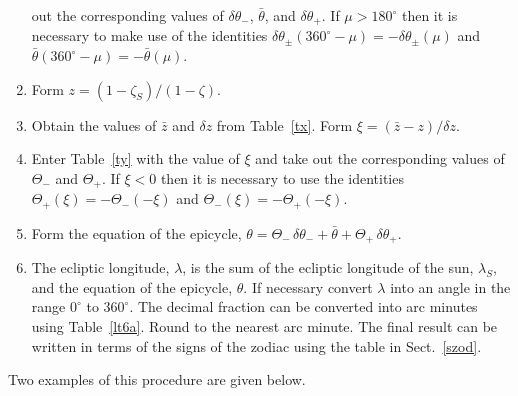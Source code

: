 \begin{enumerate}
out the corresponding values of $\delta\theta_-$, $\bar{\theta}$, and
$\delta\theta_+$. If $\mu > 180^\circ$ then it is necessary to make use
of the identities $\delta\theta_\pm(360^\circ - \mu) =-\delta\theta_\pm(\mu)$
and $\bar{\theta}(360^\circ - \mu) =-\bar{\theta}(\mu)$.
\item Form $z = (1-\zeta_S)/(1-\zeta)$.
\item Obtain the values of $\bar{z}$ and $\delta z$ from Table~\ref{tx}.
Form $\xi = (\bar{z}-z)/\delta z$.
\item Enter Table~\ref{ty} with the value of $\xi$ and take out
the corresponding values of $\Theta_-$ and $\Theta_+$. If $\xi<0$ then
it is necessary to use the identities $\Theta_+(\xi)=-\Theta_-(-\xi)$
and $\Theta_-(\xi)=-\Theta_+(-\xi)$. 
\item Form the equation of the epicycle, $\theta = \Theta_-\,\delta\theta_-+ \bar{\theta}
+ \Theta_+\,\delta\theta_+$.
\item The ecliptic longitude, $\lambda$, is the sum of the ecliptic longitude of the sun, $\lambda_S$,   and the equation
of the epicycle, $\theta$. If necessary convert $\lambda$
into  an angle in the range $0^\circ$ to $360^\circ$. The decimal fraction can
be converted into arc minutes
using Table~\ref{lt6a}. Round to the nearest arc minute. The final result
can be written in terms of the signs of the zodiac using the table in Sect.~\ref{szod}.
\end{enumerate}
Two examples of this procedure are given below.

